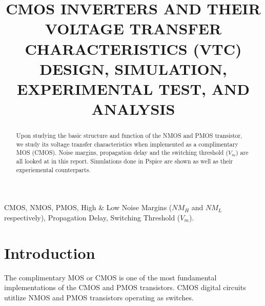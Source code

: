 \documentclass[conference]{IEEEtran}
\begin{document}
\title{
    CMOS INVERTERS AND THEIR VOLTAGE TRANSFER CHARACTERISTICS (VTC) DESIGN, 
    SIMULATION, EXPERIMENTAL TEST, AND ANALYSIS\\
}

\author{
    \and
}

\maketitle

\begin{abstract}
    Upon studying the basic structure and function of the NMOS and PMOS transistor,
    we study its voltage transfer characteristics when implemented as a complimentary 
    MOS (CMOS). Noise margins, propagation delay and the switching threshold ($V_m$)
    are all looked at in this report. Simulations done in Pspice are shown 
    as well as their experiemental counterparts.
\end{abstract}

\begin{IEEEkeywords}
    CMOS, NMOS, PMOS, High \& Low Noise Margins ($NM_H$ and $NM_L$ respectively), 
    Propagation Delay, Switching Threshold ($V_m$).
\end{IEEEkeywords}

\section{Introduction}
    The complimentary MOS or CMOS is one of the most fundamental implementations 
    of the CMOS and PMOS transistors. CMOS digital circuits utitlize NMOS and 
    PMOS transistors operating as switches. 
    
\end{document}
